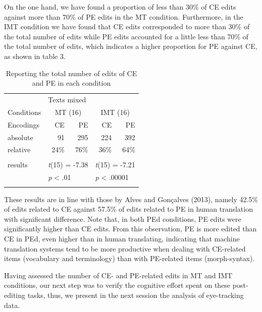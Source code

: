 \documentclass[output=paper]{langsci/langscibook}
\begin{document}
On the one hand, we have found a proportion of less than 30\% of CE edits against more than 70\% of PE edits in the MT condition. Furthermore, in the IMT condition we have found that CE edits corresponded to more than 30\% of the total number of edits while PE edits accounted for a little less than 70\% of the total number of edits, which indicates a higher proportion for PE against CE, as shown in table 3. 

\begin{table}
\begin{tabular}{lrrrr}
\lsptoprule
~ & \multicolumn{4}{l}{Texts mixed}\\
Conditions & \multicolumn{2}{c}{MT (16)} & \multicolumn{2}{c}{IMT (16)}\\
Encodings & {CE } & PE & {CE } & PE\\
\midrule
absolute & {91} & 295 & {224} & 392\\
relative & {24\%} & 76\% & {36\%} & 64\%\\\\
results & \multicolumn{2}{l}{\textit{t}(15) = -7.38} & \multicolumn{2}{l}{\textit{t}(15) = -7.21}\\
~ & \multicolumn{2}{l}{\textit{p} {\textless} .01} & \multicolumn{2}{l}{\textit{p} {\textless} .00001}\\
\lspbottomrule
\end{tabular}
\caption{Reporting the total number of edits of CE and PE in each condition}
\label{tab:3}
\end{table}


These results are in line with those by Alves and Gonçalves (2013), namely 42.5\% of edits related to CE against 57.5\% of edits related to PE in human translation with significant difference. Note that, in both PEd conditions, PE edits were significantly higher than CE edits. From this observation, PE is more edited than CE in PEd, even higher than in human translating, indicating that machine translation systems tend to be more productive when dealing with CE-related items (vocabulary and terminology) than with PE-related items (morph-syntax).  



Having assessed the number of CE- and PE-related edits in MT and IMT conditions, our next step was to verify the cognitive effort spent on these post-editing tasks, thus, we present in the next session the analysis of eye-tracking data.
\end{document}

